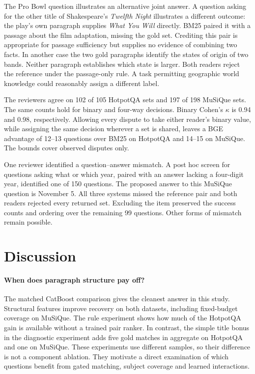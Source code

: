 \documentclass[twoside,a4paper,11pt]{article}
\begin{document}
The Pro Bowl question illustrates an alternative joint answer. A question asking for the other title of Shakespeare's \emph{Twelfth Night} illustrates a different outcome: the play's own paragraph supplies \emph{What You Will} directly. BM25 paired it with a passage about the film adaptation, missing the gold set. Crediting this pair is appropriate for passage sufficiency but supplies no evidence of combining two facts. In another case the two gold paragraphs identify the states of origin of two bands. Neither paragraph establishes which state is larger. Both readers reject the reference under the passage-only rule. A task permitting geographic world knowledge could reasonably assign a different label.

The reviewers agree on 102 of 105 HotpotQA sets and 197 of 198 MuSiQue sets. The same counts hold for binary and four-way decisions. Binary Cohen's $\kappa$ is 0.94 and 0.98, respectively. Allowing every dispute to take either reader's binary value, while assigning the same decision wherever a set is shared, leaves a BGE advantage of 12--13 questions over BM25 on HotpotQA and 14--15 on MuSiQue. The bounds cover observed disputes only.

One reviewer identified a question--answer mismatch. A post hoc screen for questions asking what or which year, paired with an answer lacking a four-digit year, identified one of 150 questions. The proposed answer to this MuSiQue question is November 5. All three systems missed the reference pair and both readers rejected every returned set. Excluding the item preserved the success counts and ordering over the remaining 99 questions. Other forms of mismatch remain possible.

\section{Discussion}
\paragraph{When does paragraph structure pay off?}
The matched CatBoost comparison gives the cleanest answer in this study. Structural features improve recovery on both datasets, including fixed-budget coverage on MuSiQue. The rule experiment shows how much of the HotpotQA gain is available without a trained pair ranker. In contrast, the simple title bonus in the diagnostic experiment adds five gold matches in aggregate on HotpotQA and one on MuSiQue. These experiments use different samples, so their difference is not a component ablation. They motivate a direct examination of which questions benefit from gated matching, subject coverage and learned interactions.
\end{document}
